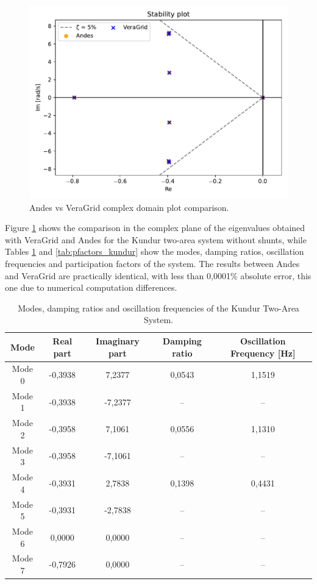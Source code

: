 \begin{table}[H]
\begin{tabular}{|l|l|l|l|}
\end{tabular}
\end{table}

\begin{figure}[H]
  \centering
  \includegraphics[width=0.7\linewidth]{inkscape_svg/andes_vs_veragrid_kundur.pdf}
  \caption{Andes vs VeraGrid complex domain plot comparison.}
  \label{fig:AndesvsVeraGrid}
\end{figure}


Figure \ref{fig:AndesvsVeraGrid} shows the comparison in the complex plane of the eigenvalues obtained
with VeraGrid and Andes for the Kundur two-area system without shunts, while Tables \ref{tab:eigenvalues_kundur} and
\ref{tab:pfactors_kundur} show the modes, damping ratios, oscillation frequencies and participation factors of the system.
The results between Andes and VeraGrid are practically identical, 
with less than 0,0001\% absolute error, this one due to numerical computation differences.


\begin{table}[H]
\centering
\caption{Modes, damping ratios and oscillation frequencies of the Kundur Two-Area System.}
\label{tab:eigenvalues_kundur}
\renewcommand{\arraystretch}{1.2}
\small
\begin{tabular}{|c|c|c|c|c|}
\hline
\textbf{Mode} & \textbf{Real part} & \textbf{Imaginary part} & \textbf{Damping ratio} & \textbf{Oscillation Frequency [Hz]} \\ 
\hline
Mode 0 & -0,3938 & 7,2377 & 0,0543 & 1,1519 \\
Mode 1 & -0,3938 & -7,2377 & -- & -- \\
Mode 2 & -0,3958 & 7,1061 & 0,0556 & 1,1310 \\
Mode 3 & -0,3958 & -7,1061 & -- & -- \\
Mode 4 & -0,3931 & 2,7838 & 0,1398 & 0,4431 \\
Mode 5 & -0,3931 & -2,7838 & -- & -- \\
Mode 6 & 0,0000  & 0,0000  & -- & -- \\
Mode 7 & -0,7926 & 0,0000  & -- & -- \\
\hline
\end{tabular}
\end{table}


